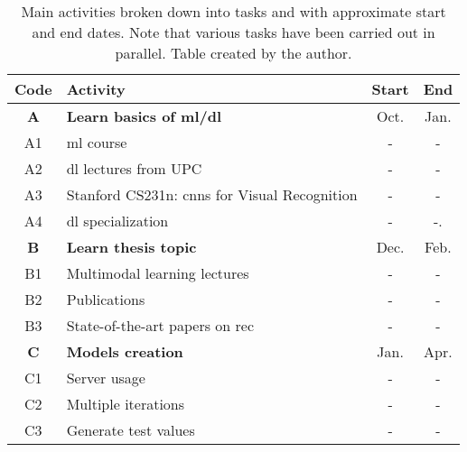 \begin{table}[p]
  \centering
  \caption[Main activities broken down into tasks]{Main activities broken down
    into tasks and with approximate start and end dates. Note that various
    tasks have been carried out in parallel. Table created by the
    author.}%
  \label{tab:activities}
  \begin{tabular}{cp{}cc}
    \toprule

    \rowcolor{gray!37.5}
    \textbf{Code} & \textbf{Activity} & \textbf{Start} & \textbf{End} \\
    \midrule

    \rowcolor{rowColor}
    \textbf{A} & \textbf{Learn basics of \acs{ml}/\acs{dl}}                                      & Oct. & Jan. \\
    \rowcolor{rowColor}
    A1         & \Acs{ml} course \cite{ng20:machin_learn}                                        & -    & -    \\
    \rowcolor{rowColor}
    A2         & \Acs{dl} lectures from UPC \cite{giro-i-nieto20:all_deep_learn_upc_etset_telec} & -    & -    \\
    \rowcolor{rowColor}
    A3         & Stanford CS231n: \acsp{cnn} for Visual Recognition \cite{li20:cs231}            & -    & -    \\
    \rowcolor{rowColor}
    A4         & \Acs{dl} specialization \cite{ng20:deep_learn_special}                          & -    & -.   \\
    \midrule

    \textbf{B} & \textbf{Learn thesis topic}                                                       & Dec. & Feb. \\
    B1         & Multimodal learning lectures \cite{giro-i-nieto20:all_deep_learn_upc_etset_telec} & -    & -    \\
    B2         & Publications                                                                      & -    & -    \\
    B3         & State-of-the-art papers on \acs{rec}                                              & -    & -    \\
    \midrule

    \rowcolor{rowColor}
    \textbf{C}             & \textbf{Models creation} & Jan. & Apr. \\
    \rowcolor{rowColor} C1 & Server usage             & -    & -    \\
    \rowcolor{rowColor} C2 & Multiple iterations      & -    & -    \\
    \rowcolor{rowColor} C3 & Generate test values     & -    & -    \\
    \midrule


\end{tabular}
\end{table}
